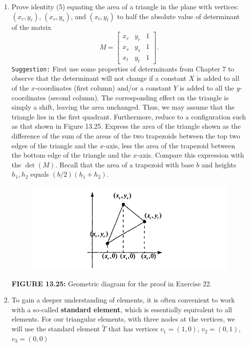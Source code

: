 \documentclass[../main.tex]{subfiles}
\begin{document}
\begin{enumerate}
	\item Prove identity (5) equating the area of a triangle in the plane with vertices: $\left(x_{r}, y_{r}\right)$, $\left(x_{s}, y_{s}\right)$, and $\left(x_{t}, y_{t}\right)$ to half the absolute value of determinant of the matrix
$$
M=\left[\begin{array}{lll}
x_{r} & y_{r} & 1 \\
x_{s} & y_{s} & 1 \\
x_{t} & y_{t} & 1
\end{array}\right] .
$$
\texttt{Suggestion:} First use some properties of determinants from Chapter 7 to observe that the determinant will not change if a constant $X$ is added to all of the $x$-coordinates (first column) and/or a constant $Y$ is added to all the $y$-coordinates (second column). The corresponding effect on the triangle is simply a shift, leaving the area unchanged. Thus, we may assume that the triangle lies in the first quadrant. Furthermore, reduce to a configuration such as that shown in Figure 13.25. Express the area of the triangle shown as the difference of the sum of the areas of the two trapezoids between the top two edges of the triangle and the $x$-axis, less the area of the trapezoid between the bottom edge of the triangle and the $x$-axis. Compare this expression with the $\operatorname{det}(M)$. Recall that the area of a trapezoid with base $b$ and heights $h_{1}, h_{2}$ equals $(b / 2)\left(h_{1}+h_{2}\right)$.
\begin{figure}[H]
\includegraphics[width=0.9\linewidth]{10}
	\centering
	\label{pfig:ch13_8}
\end{figure}
\textbf{FIGURE 13.25:} Geometric diagram for the proof in Exercise 22. 
	\item To gain a deeper understanding of elements, it is often convenient to work with a so-called \textbf{standard element}, which is essentially equivalent to all elements. For our triangular elements, with three nodes at the vertices, we will use the standard element $\tilde{T}$ that has vertices $v_{1}=(1,0)$, $v_{2}=(0,1)$,  $v_{3}=(0,0)$ 

\end{enumerate}
\end{document}
